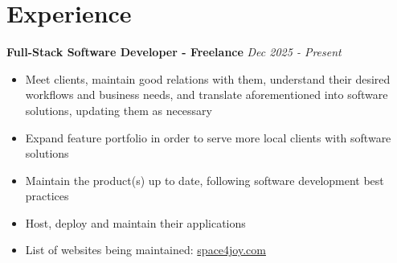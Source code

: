 \section{Experience}

\textbf{ Full-Stack Software Developer - Freelance } \hfill \textit{Dec 2025 - Present}

\begin{itemize}
    \item Meet clients, maintain good relations with them, understand their desired workflows and business needs, and translate aforementioned into software solutions, updating them as necessary
    \item Expand feature portfolio in order to serve more local clients with software solutions
    \item Maintain the product(s) up to date, following software development best practices
    \item Host, deploy and maintain their applications
    \item List of websites being maintained: \href{https://space4joy.com/}{space4joy.com}
\end{itemize}